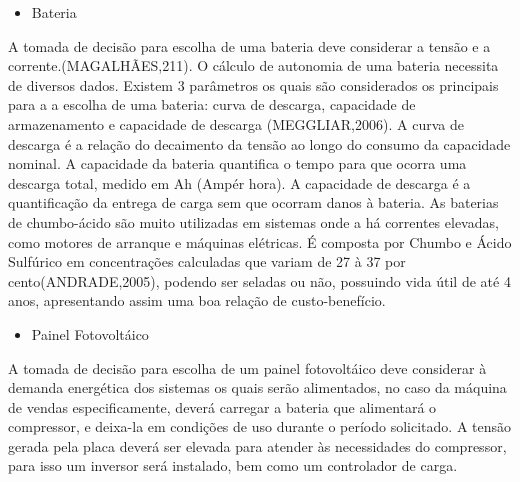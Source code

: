 \begin{itemize}
\item Bateria
\end{itemize}
	  
      A tomada de decisão para escolha de uma bateria deve considerar a tensão e a corrente.(MAGALHÃES,211). O cálculo de autonomia de uma bateria necessita de diversos dados. Existem 3 parâmetros os quais são considerados os principais para a a escolha de uma bateria: curva de descarga, capacidade de armazenamento e capacidade de descarga (MEGGLIAR,2006). A curva de descarga é a relação do decaimento da tensão ao longo do consumo da capacidade nominal. A capacidade da bateria quantifica o tempo para que ocorra uma descarga total, medido em Ah (Ampér hora). A capacidade de descarga é a quantificação da entrega de carga sem que ocorram danos à bateria.
      As baterias de chumbo-ácido são muito utilizadas em sistemas onde a há correntes  elevadas, como motores de arranque e máquinas elétricas. É composta por Chumbo e Ácido Sulfúrico em concentrações calculadas que variam de 27 à 37 por cento(ANDRADE,2005), podendo ser seladas ou não, possuindo vida útil de até 4 anos, apresentando assim uma boa relação de custo-benefício.
            
\begin{itemize}
\item Painel Fotovoltáico
\end{itemize}

		A tomada de decisão para escolha de um painel fotovoltáico deve considerar à demanda energética dos sistemas os quais serão alimentados, no caso da máquina de vendas especificamente, deverá carregar a bateria que alimentará o compressor, e deixa-la em condições de uso durante o período solicitado. A tensão gerada pela placa deverá ser elevada para atender às necessidades do compressor, para isso um inversor será instalado, bem como um controlador de carga.
        
  